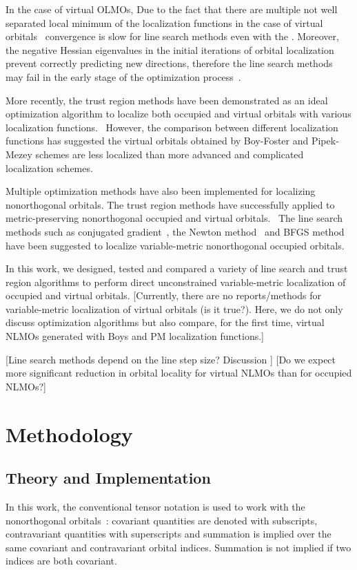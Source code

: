 \documentclass[aps,prl,reprint,amsmath,amssymb]{revtex4-1}
\begin{document}
In the case of virtual OLMOs, 
Due to the fact that there are multiple not well separated local minimum of the localization functions in the case of virtual orbitals~\cite{subotnik2005fast} convergence is slow for line search methods even with the .
Moreover, the negative Hessian eigenvalues in the initial iterations of orbital localization prevent correctly predicting new directions, therefore the line search methods may fail in the early stage of the optimization process~\cite{RZK-citation-is-needed}.

More recently, the trust region methods have been demonstrated as an ideal optimization algorithm to localize both occupied and virtual orbitals with various localization functions.~\cite{jansik2011local, hoyvik2012trust, hoyvik2012orbital, hoyvik2013pipek}
However, the comparison between different localization functions has suggested the virtual orbitals obtained by Boy-Foster and Pipek-Mezey schemes are less localized than more advanced and complicated localization schemes.~\cite{hoyvik2013localized} 

Multiple optimization methods have also been implemented for localizing nonorthogonal orbitals.
The trust region methods have successfully applied to metric-preserving nonorthogonal occupied and virtual orbitals.~\cite{hoyvik2017generalising}
The line search methods such as conjugated gradient~\cite{liu2000nonorthogonal}, the Newton method~\cite{feng2004An_efficient} and BFGS method~\cite{cui2010efficient} have been suggested to localize variable-metric nonorthogonal occupied orbitals.

In this work, we designed, tested and compared a variety of line search and trust region algorithms to perform direct unconstrained variable-metric localization of occupied and virtual orbitals. [Currently, there are no reports/methods for variable-metric localization of virtual orbitals (is it true?). Here, we do not only discuss optimization algorithms but also compare, for the first time, virtual NLMOs generated with Boys and PM localization functions.]

[Line search methods depend on the line step size? Discussion ]
[Do we expect more significant reduction in orbital locality for virtual NLMOs than for occupied NLMOs?]

\section{Methodology}
\subsection{Theory and Implementation}
In this work, the conventional tensor notation is used to work with the nonorthogonal orbitals~\cite{head1998tensor}: covariant quantities are denoted with subscripts, contravariant quantities with superscripts and summation is implied over the same covariant and contravariant orbital indices. Summation is not implied if two indices are both covariant. 
\end{document}
